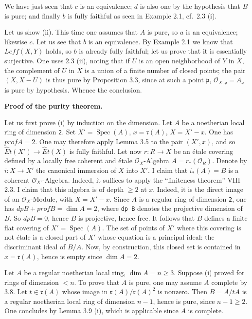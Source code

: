 \documentclass[
]{article}
\begin{document}
We have just seen that \(c\) is an equivalence; \(d\) is also one by the
hypothesis that \(B\) is pure; and finally \(b\) is fully faithful as
seen in Example 2.1, cf.~2.3 (i).

Let us show (ii). This time one assumes that \(A\) is pure, so \(a\) is
an equivalence; likewise \(c\). Let us see that \(b\) is an equivalence.
By Example 2.1 we know that \(Leff(X, Y)\) holds, so \(b\) is already
fully faithful; let us prove that it is essentially surjective. One uses
2.3 (ii), noting that if \(U\) is an open neighborhood of \(Y\) in
\(X\), the complement of \(U\) in \(X\) is a union of a finite number of
closed points; the pair \((X, X - U)\) is thus pure by Proposition 3.3,
since at such a point \(\mathfrak{p}\),
\(\mathcal{O}_{X,\mathfrak{p}} = A_{\mathfrak{p}}\) is pure by
hypothesis. Whence the conclusion.

\textbf{Proof of the purity theorem.}

Let us first prove (i) by induction on the dimension. Let \(A\) be a
noetherian local ring of dimension \texttt{2}. Set
\(X' = \operatorname{Spec}(A)\), \(x = \mathfrak{r}(A)\),
\(X = X' - {x}\). One has \(prof A = 2\). One may therefore apply Lemma
3.5 to the pair \((X', {x})\), and so \(\hat{E}t(X') \to \hat{E}t(X)\)
is fully faithful. Let now \(r: R \to X\) be an étale covering defined
by a locally free coherent and étale \(\mathcal{O}_{X}\)-Algebra
\(A = r_{*}(\mathcal{O}_{R})\). Denote by \(i: X \to X'\) the canonical
immersion of \(X\) into \(X'\). I claim that \(i_{*}(A) = B\) is a
coherent \(\mathcal{O}_{X'}\)-Algebra. Indeed, it suffices to apply the
``finiteness theorem'' VIII 2.3. I claim that this algebra is of depth
\(\geqslant 2\) at \(x\). Indeed, it is the direct image of an
\(\mathcal{O}_{X}\)-Module, with \(X = X' - {x}\). Since \(A\) is a
regular ring of dimension \texttt{2}, one has
\(dp B + prof B = \dim A = 2\), where \texttt{dp\ B} denotes the
projective dimension of \(B\). So \(dp B = 0\), hence \(B\) is
projective, hence free. It follows that \(B\) defines a finite flat
covering of \(X' = \operatorname{Spec}(A)\). The set of points of \(X'\)
where this covering is not étale is a closed part of \(X'\) whose
equation is a principal ideal: the discriminant ideal of \(B/A\). Now,
by construction, this closed set is contained in
\(x = \mathfrak{r}(A)\), hence is empty since \(\dim A = 2\).

Let \(A\) be a regular noetherian local ring,
\(\dim A = n \geqslant 3\). Suppose (i) proved for rings of dimension
\(< n\). To prove that \(A\) is pure, one may assume \(A\) complete by
3.8. Let \(t \in \mathfrak{r}(A)\) whose image in
\(\mathfrak{r}(A)/\mathfrak{r}(A)^{2}\) is nonzero. Then \(B = A/tA\) is
a regular noetherian local ring of dimension \(n - 1\), hence is pure,
since \(n - 1 \geqslant 2\). One concludes by Lemma 3.9 (i), which is
applicable since \(A\) is complete.
\end{document}
